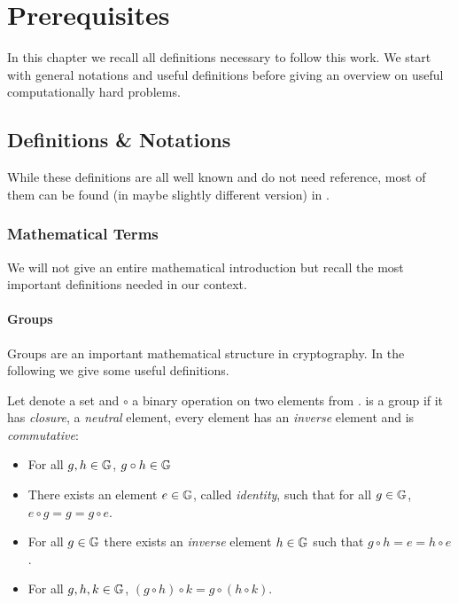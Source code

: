 \chapter{Prerequisites}\label{ch:background}
In this chapter we recall all definitions necessary to follow this work.
We start with general notations and useful definitions before giving an overview on useful computationally hard problems.

\section{Definitions \& Notations}
While these definitions are all well known and do not need reference, most of them can be found (in maybe slightly different version) in \cite{katz2008introduction}.

\subsection{Mathematical Terms}
We will not give an entire mathematical introduction but recall the most important definitions needed in our context.

\subsubsection{Groups}
Groups are an important mathematical structure in cryptography.
In the following we give some useful definitions.

\begin{definition}[Groups]\label{def:groups}
Let \GG denote a set and $\circ$ a binary operation on two elements from \GG.
\GG is a group if it has \emph{closure}, a \emph{neutral} element, every element has an \emph{inverse} element and is \emph{commutative}:
\begin{itemize}
	\item For all $g,h\in\mathbb{G}$, $g\circ h \in\mathbb{G}$
	\item There exists an element $e\in\mathbb{G}$, called \emph{identity}, such that for all $g\in\mathbb{G}$, $e\circ g=g=g\circ e$.
	\item For all $g\in\mathbb{G}$ there exists an \emph{inverse} element $h\in\mathbb{G}$ such that $g\circ h=e=h\circ e$.
	\item For all $g,h,k\in\mathbb{G}$, $(g\circ h)\circ k=g\circ (h \circ k)$.
\end{itemize}
\eod
\end{definition}

